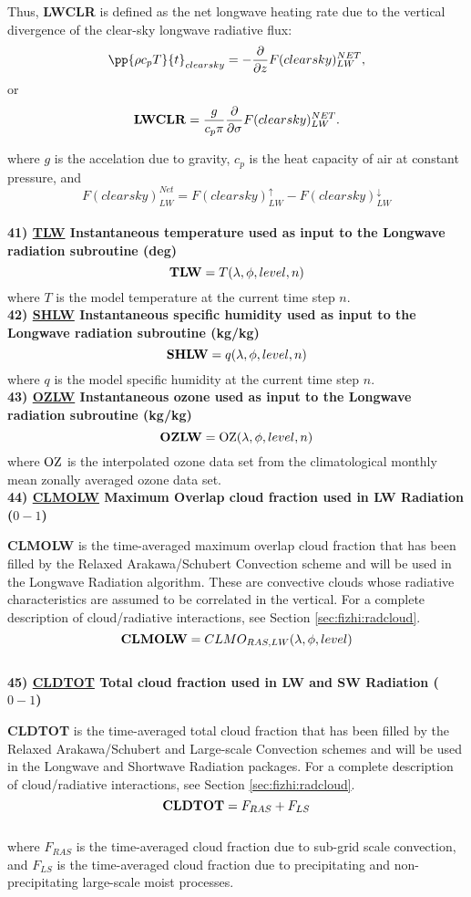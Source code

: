 \noindent
Thus, {\bf LWCLR} is defined as the net longwave heating rate due to the 
vertical divergence of the
clear-sky longwave radiative flux:
\[
\pp{\rho c_p T}{t}_{clearsky} = - {\partial \over \partial z} F(clearsky)_{LW}^{NET} ,
\]
or
\[
{\bf LWCLR} = \frac{g}{c_p \pi} {\partial \over \partial \sigma} F(clearsky)_{LW}^{NET} .
\]

\noindent
where $g$ is the accelation due to gravity,
$c_p$ is the heat capacity of air at constant pressure,
and
\[
F(clearsky)_{LW}^{Net} = F(clearsky)_{LW}^\uparrow - F(clearsky)_{LW}^\downarrow
\]
\\

 
\noindent
{\bf 41)  \underline {TLW} Instantaneous temperature used as input to the Longwave
 radiation subroutine (deg)}
\[
{\bf TLW}  = T(\lambda , \phi ,level, n)
\]
\noindent
where $T$ is the model temperature at the current time step $n$.
\\
 
 
\noindent
{\bf 42)  \underline {SHLW} Instantaneous specific humidity used as input to
 the Longwave radiation subroutine (kg/kg)}
\[
{\bf SHLW}  = q(\lambda , \phi , level , n)
\]
\noindent
where $q$ is the model specific humidity at the current time step $n$.
\\
 
 
\noindent
{\bf 43)  \underline {OZLW} Instantaneous ozone used as input to
 the Longwave radiation subroutine (kg/kg)}
\[
{\bf OZLW}  = {\rm OZ}(\lambda , \phi , level , n)
\]
\noindent
where $\rm OZ$ is the interpolated ozone data set from the climatological monthly
mean zonally averaged ozone data set.
\\
 

\noindent
{\bf 44) \underline {CLMOLW} Maximum Overlap cloud fraction used in LW Radiation ($0-1$) }

\noindent
{\bf CLMOLW} is the time-averaged maximum overlap cloud fraction that has been filled by the Relaxed
Arakawa/Schubert Convection scheme and will be used in the Longwave Radiation algorithm.  These are
convective clouds whose radiative characteristics are assumed to be correlated in the vertical.
For a complete description of cloud/radiative interactions, see Section \ref{sec:fizhi:radcloud}.
\[
{\bf CLMOLW} = CLMO_{RAS,LW}(\lambda, \phi,  level )
\]
\\
 

{\bf 45) \underline {CLDTOT} Total cloud fraction used in LW and SW Radiation ($0-1$) }

{\bf CLDTOT} is the time-averaged total cloud fraction that has been filled by the Relaxed
Arakawa/Schubert and Large-scale Convection schemes and will be used in the Longwave and Shortwave
Radiation packages.
For a complete description of cloud/radiative interactions, see Section \ref{sec:fizhi:radcloud}.
\[
{\bf CLDTOT} = F_{RAS} + F_{LS}
\]
\\
where $F_{RAS}$ is the time-averaged cloud fraction due to sub-grid scale convection, and $F_{LS}$ is the
time-averaged cloud fraction due to precipitating and non-precipitating large-scale moist processes.
\\


